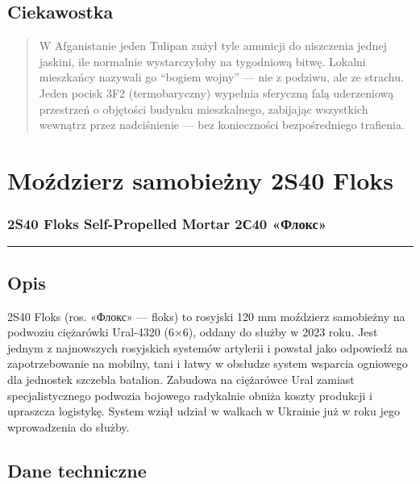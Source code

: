 \documentclass[12pt,openany,oneside]{book}
\begin{document}
\section{Ciekawostka}\label{ciekawostka-14}

\begin{quote}
W Afganistanie jeden Tulipan zużył tyle amunicji do niszczenia jednej
jaskini, ile normalnie wystarczyłoby na tygodniową bitwę. Lokalni
mieszkańcy nazywali go ``bogiem wojny'' --- nie z podziwu, ale ze
strachu. Jeden pocisk 3F2 (termobaryczny) wypełnia sferyczną falą
uderzeniową przestrzeń o objętości budynku mieszkalnego, zabijając
wszystkich wewnątrz przez nadciśnienie --- bez konieczności
bezpośredniego trafienia.
\end{quote}

\chapter{Moździerz samobieżny 2S40
Floks}\label{moux17adzierz-samobieux17cny-2s40-floks}

\subsection{2S40 Floks Self-Propelled Mortar \textbar{} 2С40
«Флокс»}\label{s40-floks-self-propelled-mortar-2ux44140-ux444ux43bux43eux43aux441}

\begin{center}\rule{0.5\linewidth}{0.5pt}\end{center}

\section{Opis}\label{opis-15}

2S40 Floks (ros. «Флокс» --- floks) to rosyjski 120 mm moździerz
samobieżny na podwoziu ciężarówki Ural-4320 (6×6), oddany do służby w
2023 roku. Jest jednym z najnowszych rosyjskich systemów artylerii i
powstał jako odpowiedź na zapotrzebowanie na mobilny, tani i łatwy w
obsłudze system wsparcia ogniowego dla jednostek szczebla batalion.
Zabudowa na ciężarówce Ural zamiast specjalistycznego podwozia bojowego
radykalnie obniża koszty produkcji i upraszcza logistykę. System wziął
udział w walkach w Ukrainie już w roku jego wprowadzenia do służby.

\section{Dane techniczne}\label{dane-techniczne-15}
\end{document}
